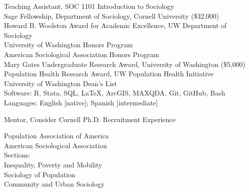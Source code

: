 \documentclass[11pt]{article} %
\begin{document}
 Teaching Assistant, SOC 1101 Introduction to Sociology \\



 Sage Fellowship, Department of Sociology, Cornell University (\$32,000) \\
 Howard B. Woolston Award for Academic Excellence, UW Department of Sociology \\
 University of Washington Honors Program \\
 American Sociological Association Honors Program \\
 Mary Gates Undergraduate Research Award, University of Washington (\$5,000)	\\	
 Population Health Research Award, UW Population Health Initiative 	\\
 University of Washington Dean’s List \\					     

Software: R, Stata, SQL, \LaTeX, ArcGIS, MAXQDA, Git, GitHub, Bash \\
Languages: English [native]; Spanish [intermediate] \\


\hspace*{10mm} Mentor, Consider Cornell Ph.D. Recruitment Experience \\
\smallskip 

Population Association of America \\
American Sociological Association \\
Sections: \\
\hspace*{10mm} Inequality, Poverty and Mobility \\
\hspace*{10mm} Sociology of Population \\
\hspace*{10mm} Community and Urban Sociology \\
\end{document}
